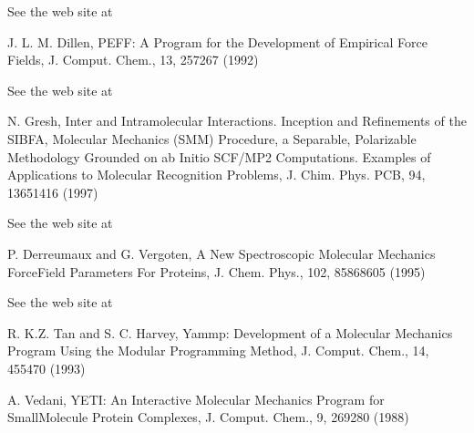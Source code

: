 \documentclass[letterpaper,11pt,english]{sphinxmanual}
\begin{document}
     See the web site at 

     J. L. M. Dillen, PEFF: A Program for the Development of Empirical Force Fields, J. Comput. Chem., 13, 257\sphinxhyphen{}267 (1992)

     See the web site at 

     N. Gresh, Inter\sphinxhyphen{} and Intramolecular Interactions. Inception and Refinements of the SIBFA, Molecular Mechanics (SMM) Procedure, a Separable, Polarizable Methodology Grounded on ab Initio SCF/MP2 Computations. Examples of Applications to Molecular Recognition Problems, J. Chim. Phys. PCB, 94, 1365\sphinxhyphen{}1416 (1997)

     See the web site at 

     P. Derreumaux and G. Vergoten, A New Spectroscopic Molecular Mechanics Force\sphinxhyphen{}Field \sphinxhyphen{} Parameters For Proteins, J. Chem. Phys., 102, 8586\sphinxhyphen{}8605 (1995)

     See the web site at 

     R. K.\sphinxhyphen{}Z. Tan and S. C. Harvey, Yammp: Development of a Molecular Mechanics Program Using the Modular Programming Method, J. Comput. Chem., 14, 455\sphinxhyphen{}470 (1993)

     A. Vedani, YETI: An Interactive Molecular Mechanics Program for Small\sphinxhyphen{}Molecule Protein Complexes, J. Comput. Chem., 9, 269\sphinxhyphen{}280 (1988)
\end{document}
